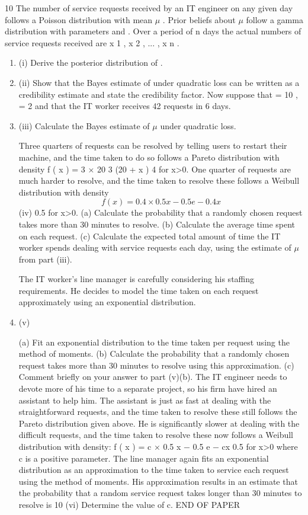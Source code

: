 \documentclass[a4paper,12pt]{article}
\begin{document}
10
The number of service requests received by an IT engineer on any given day follows a
Poisson distribution with mean $\mu$ . Prior beliefs about $\mu$ follow a gamma distribution
with parameters \alpha and \lambda . Over a period of n days the actual numbers of service
requests received are x 1 , x 2 , ... , x n .
\begin{enumerate}
\item (i) Derive the posterior distribution of \mu .
\item (ii) Show that the Bayes estimate of \mu under quadratic loss can be written as a
credibility estimate and state the credibility factor.
\medskip
[3]
Now suppose that \alpha = 10 , \lambda = 2 and that the IT worker receives 42 requests in
6 days.
\item (iii)
Calculate the Bayes estimate of $\mu$ under quadratic loss.

Three quarters of requests can be resolved by telling users to restart their machine,
and the time taken to do so follows a Pareto distribution with density
f ( x ) =
3 × 20 3
(20 + x ) 4
for x>0.
One quarter of requests are much harder to resolve, and the time taken to resolve these
follows a Weibull distribution with density
\[f ( x ) = 0.4 × 0.5 x − 0.5 e − 0.4 x\]
(iv)
0.5
for x>0.
(a) Calculate the probability that a randomly chosen request takes more
than 30 minutes to resolve.
(b) Calculate the average time spent on each request.
(c) Calculate the expected total amount of time the IT worker spends
dealing with service requests each day, using the estimate of $\mu$  from
part (iii).

The IT worker’s line manager is carefully considering his staffing requirements. He
decides to model the time taken on each request approximately using an exponential
distribution.
\item (v)

(a) Fit an exponential distribution to the time taken per request using the
method of moments.
(b) Calculate the probability that a randomly chosen request takes more
than 30 minutes to resolve using this approximation.
(c) Comment briefly on your answer to part (v)(b).
The IT engineer needs to devote more of his time to a separate project, so his firm
have hired an assistant to help him. The assistant is just as fast at dealing with the
straightforward requests, and the time taken to resolve these still follows the Pareto
distribution given above. He is significantly slower at dealing with the difficult
requests, and the time taken to resolve these now follows a Weibull distribution with
density:
f ( x ) = c × 0.5 x − 0.5 e − cx
0.5
for x>0
where c is a positive parameter. The line manager again fits an exponential
distribution as an approximation to the time taken to service each request using the
method of moments. His approximation results in an estimate that the probability that
a random service request takes longer than 30 minutes to resolve is 10%
(vi)
Determine the value of c.
END OF PAPER
\end{enumerate}
\end{document}
